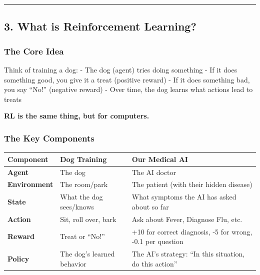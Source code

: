 \documentclass[
]{article}
\begin{document}
\begin{center}\rule{0.5\linewidth}{0.5pt}\end{center}

\hypertarget{what-is-reinforcement-learning}{%
\subsection{3. What is Reinforcement
Learning?}\label{what-is-reinforcement-learning}}

\hypertarget{the-core-idea}{%
\subsubsection{The Core Idea}\label{the-core-idea}}

Think of training a dog: - The dog (agent) tries doing something - If it
does something good, you give it a treat (positive reward) - If it does
something bad, you say ``No!'' (negative reward) - Over time, the dog
learns what actions lead to treats

\textbf{RL is the same thing, but for computers.}

\hypertarget{the-key-components}{%
\subsubsection{The Key Components}\label{the-key-components}}

\begin{longtable}[]{@{}
  >{\raggedright\arraybackslash}p{}
  >{\raggedright\arraybackslash}p{}
  >{\raggedright\arraybackslash}p{}@{}}
\toprule
Component & Dog Training & Our Medical AI \\
\midrule
\endhead
\textbf{Agent} & The dog & The AI doctor \\
\textbf{Environment} & The room/park & The patient (with their hidden
disease) \\
\textbf{State} & What the dog sees/knows & What symptoms the AI has
asked about so far \\
\textbf{Action} & Sit, roll over, bark & Ask about Fever, Diagnose Flu,
etc. \\
\textbf{Reward} & Treat or ``No!'' & +10 for correct diagnosis, -5 for
wrong, -0.1 per question \\
\textbf{Policy} & The dog's learned behavior & The AI's strategy: ``In
this situation, do this action'' \\
\bottomrule
\end{longtable}
\end{document}
